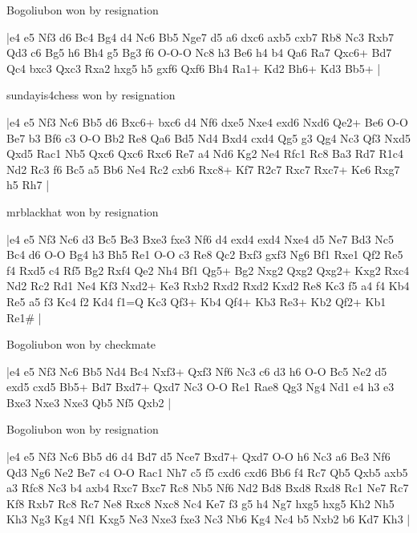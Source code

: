 \showboard

Bogoliubon won by resignation

\makegametitle
|e4 e5 Nf3 d6 Bc4 Bg4 d4 Nc6 Bb5 Nge7 d5 a6 dxc6 axb5 cxb7 Rb8 Nc3 Rxb7 Qd3 c6 Bg5 h6 Bh4 g5 Bg3 f6 O-O-O Nc8 h3 Be6 h4 b4 Qa6 Ra7 Qxc6+ Bd7 Qc4 bxc3 Qxc3 Rxa2 hxg5 h5 gxf6 Qxf6 Bh4 Ra1+ Kd2 Bh6+ Kd3 Bb5+  |

\showboard

sundayis4chess won by resignation

\makegametitle
|e4 e5 Nf3 Nc6 Bb5 d6 Bxc6+ bxc6 d4 Nf6 dxe5 Nxe4 exd6 Nxd6 Qe2+ Be6 O-O Be7 b3 Bf6 c3 O-O Bb2 Re8 Qa6 Bd5 Nd4 Bxd4 cxd4 Qg5 g3 Qg4 Nc3 Qf3 Nxd5 Qxd5 Rac1 Nb5 Qxc6 Qxc6 Rxc6 Re7 a4 Nd6 Kg2 Ne4 Rfc1 Rc8 Ba3 Rd7 R1c4 Nd2 Rc3 f6 Bc5 a5 Bb6 Ne4 Rc2 cxb6 Rxc8+ Kf7 R2c7 Rxc7 Rxc7+ Ke6 Rxg7 h5 Rh7  |

\showboard

mrblackhat won by resignation

\makegametitle
|e4 e5 Nf3 Nc6 d3 Bc5 Be3 Bxe3 fxe3 Nf6 d4 exd4 exd4 Nxe4 d5 Ne7 Bd3 Nc5 Bc4 d6 O-O Bg4 h3 Bh5 Re1 O-O c3 Re8 Qc2 Bxf3 gxf3 Ng6 Bf1 Rxe1 Qf2 Re5 f4 Rxd5 c4 Rf5 Bg2 Rxf4 Qe2 Nh4 Bf1 Qg5+ Bg2 Nxg2 Qxg2 Qxg2+ Kxg2 Rxc4 Nd2 Rc2 Rd1 Ne4 Kf3 Nxd2+ Ke3 Rxb2 Rxd2 Rxd2 Kxd2 Re8 Kc3 f5 a4 f4 Kb4 Re5 a5 f3 Kc4 f2 Kd4 f1=Q Kc3 Qf3+ Kb4 Qf4+ Kb3 Re3+ Kb2 Qf2+ Kb1 Re1\#  |

\showboard

Bogoliubon won by checkmate

\makegametitle
|e4 e5 Nf3 Nc6 Bb5 Nd4 Bc4 Nxf3+ Qxf3 Nf6 Nc3 c6 d3 h6 O-O Bc5 Ne2 d5 exd5 cxd5 Bb5+ Bd7 Bxd7+ Qxd7 Nc3 O-O Re1 Rae8 Qg3 Ng4 Nd1 e4 h3 e3 Bxe3 Nxe3 Nxe3 Qb5 Nf5 Qxb2  |

\showboard

Bogoliubon won by resignation

\makegametitle
|e4 e5 Nf3 Nc6 Bb5 d6 d4 Bd7 d5 Nce7 Bxd7+ Qxd7 O-O h6 Nc3 a6 Be3 Nf6 Qd3 Ng6 Ne2 Be7 c4 O-O Rac1 Nh7 c5 f5 cxd6 cxd6 Bb6 f4 Rc7 Qb5 Qxb5 axb5 a3 Rfc8 Nc3 b4 axb4 Rxc7 Bxc7 Rc8 Nb5 Nf6 Nd2 Bd8 Bxd8 Rxd8 Rc1 Ne7 Rc7 Kf8 Rxb7 Rc8 Rc7 Ne8 Rxc8 Nxc8 Nc4 Ke7 f3 g5 h4 Ng7 hxg5 hxg5 Kh2 Nh5 Kh3 Ng3 Kg4 Nf1 Kxg5 Ne3 Nxe3 fxe3 Nc3 Nb6 Kg4 Nc4 b5 Nxb2 b6 Kd7 Kh3  |

